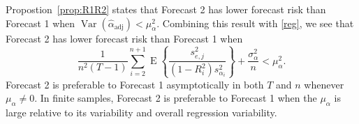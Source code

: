 \documentclass[11pt]{article}
\newcommand{\x}{\textbf{x}}
\DeclareMathOperator{\E}{E}
\DeclareMathOperator{\Var}{Var}
\begin{document}
Propostion~\ref{prop:R1R2} states that Forecast 2 has lower forecast risk 
than Forecast 1 when  
$
  \Var(\hat{\alpha}_{\text{adj}}) 
    < \mu_{\alpha}^2.
$
Combining this result with \eqref{reg}, we see that Forecast 2 has lower 
forecast risk than Forecast 1 when 
$$
  \frac{1}{n^2(T-1)}\sum_{i=2}^{n+1} \E\left\{\frac{s_{e,j}^2}{(1-R^2_i)s_{\alpha_i}^2}\right\} 
    + \frac{\sigma_{\alpha}^2}{n} < \mu_{\alpha}^2.
$$
Forecast 2 is preferable to Forecast 1 asymptotically in both $T$ and $n$ 
whenever $\mu_{\alpha} \neq 0$. In finite samples, Forecast 2 is preferable to 
Forecast 1 when the $\mu_{\alpha}$ is large relative to its variability and 
overall regression variability.  














\end{document}
